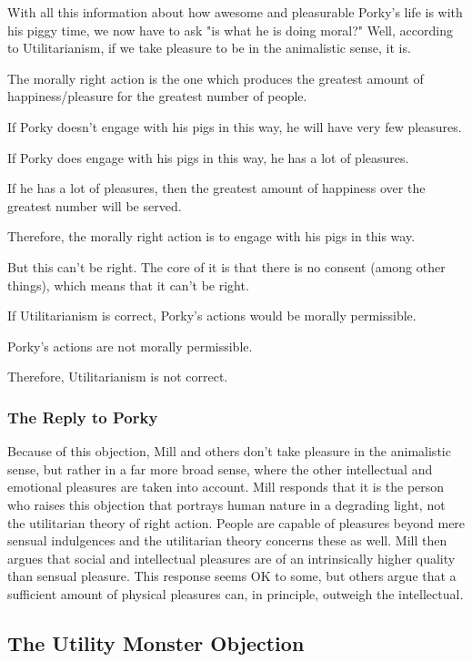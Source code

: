 With all this information about how awesome and pleasurable Porky's life is with his piggy time, we now have to ask "is what he is doing moral?" Well, according to Utilitarianism, if we take pleasure to be in the animalistic sense, it is.
\begin{earg}
    \item[]The morally right action is the one which produces the greatest amount of happiness/pleasure for the greatest number of people.
    \item[]If Porky doesn’t engage with his pigs in this way, he will have very few pleasures.
    \item[]If Porky does engage with his pigs in this way, he has a lot of pleasures.
    \item[]If he has a lot of pleasures, then the greatest amount of happiness over the greatest number will be served.
    \item[]Therefore, the morally right action is to engage with his pigs in this way.
\end{earg}
But this can't be right. The core of it is that there is no consent (among other things), which means that it can't be right.
\begin{earg}
    \item[]If Utilitarianism is correct, Porky’s actions would be morally permissible.
    \item[]Porky’s actions are not morally permissible.
    \item[]Therefore, Utilitarianism is not correct.
\end{earg}
\subsubsection{The Reply to Porky}

Because of this objection, Mill and others don't take pleasure in the animalistic sense, but rather in a far more broad sense, where the other intellectual and emotional pleasures are taken into account. Mill responds that it is the person who raises this objection that portrays human nature in a degrading light, not the utilitarian theory of right action. People are capable of pleasures beyond mere sensual indulgences and the utilitarian theory concerns these as well. Mill then argues that social and intellectual pleasures are of an intrinsically higher quality than sensual pleasure. This response seems OK to some, but others argue that a sufficient amount of physical pleasures can, in principle, outweigh the intellectual.
\subsection{The Utility Monster Objection}

